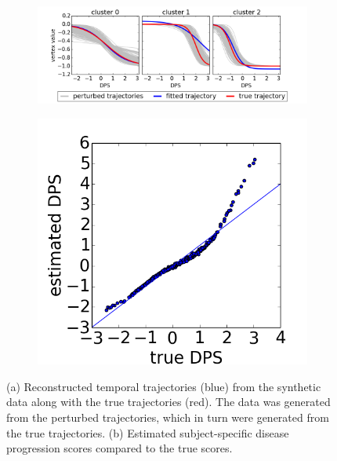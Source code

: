 \begin{figure}
\begin{subfigure}[b]{0.75\textwidth}
  \hspace{-2em}
  \includegraphics[width=1.15\textwidth]{images/vwdpm//synThetaRes_gensigInitk-meansCl3Pr1Ra0_VWDPMStd.png}
  \caption{}
  \label{fig:synThetaRes}
\end{subfigure}
\hspace{-1em}
\begin{subfigure}[b]{0.24\textwidth}
\centering
  \includegraphics[width=1.2\textwidth]{images/vwdpm/synShiftsRes_gensigInitk-meansCl3Pr1Ra0_VWDPMStd.png}
    \vspace{0.7em}
  \caption{}
  \label{fig:synShiftRes}
\end{subfigure}
\caption{(a) Reconstructed temporal trajectories (blue) from the synthetic data along with the true trajectories (red). The data was generated from the perturbed trajectories, which in turn were generated from the true trajectories. (b) Estimated subject-specific disease progression scores compared to the true scores.}
\end{figure}

